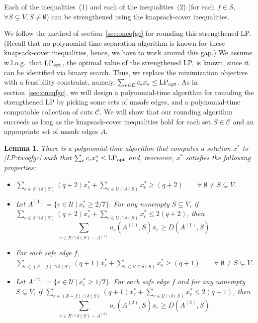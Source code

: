 \documentclass[11pt]{article}
\newtheorem{lemma}[theorem]{Lemma}
\newcommand\lpopt{\hbox{\text{LP}$_{\text{opt}}$}}
\newcommand{\safe}{\mathscr{S}}
\newcommand{\unsafe}{\mathscr{U}}
\newcommand{\C}{\mathscr{C}}
\begin{document}
{{Each of the inequalities~(1) and each of the inequalities~(2) (for
each $f\in\safe$, $\forall S\subsetneq{V},S\not=\emptyset$) can be
strengthened using the knapsack-cover inequalities.  

{
We follow the method of section~\ref{sec:oneqfgc} for rounding this strengthened LP.
(Recall that no polynomial-time separation algorithm is known for
these knapsack-cover inequalities, hence, we have to work around this gap.)
We assume w.l.o.g.\ that $\lpopt$, the optimal value of the
strengthened LP, is known, since it can be identified via binary
search. Thus, we replace the minimization objective with a feasibility
constraint, namely, $\sum_{e\in E}c_e x_e \leq \lpopt$.
As in section~\ref{sec:oneqfgc}, we will design a polynomial-time
algorithm for rounding the strengthened LP by picking some sets of
unsafe edges, and a polynomial-time computable collection of cuts 
$\C$.  We will show that our rounding algorithm succeeds as long 
as the knapsack-cover inequalities hold for each set $S\in\C$ and
an appropriate set of unsafe edges $A$. 
}


{
\begin{lemma}\label{lem:polytimeKC-twoqfgc}
There is a polynomial-time algorithm that computes a solution $x^*$
to \eqref{LP:twoqfgc}
such that $\sum_e c_ex^*_e\leq\lpopt$ and, moreover, $x^*$ satisfies
the following properties:

\begin{itemize}
\item[(P3)]
$\sum_{e\in\safe\cap\delta(S)} (q+2) x^*_e +
\sum_{e\in\unsafe\cap\delta(S)} x^*_e \geq (q+2) \qquad\forall\;
        \emptyset\neq{S}\subsetneq{V}$.

\item[(P4)]
Let $A^{(1)} = \{ e \in  \unsafe~|~x^*_e \ge 2/7 \}.$
For any nonempty ${S}\subsetneq{V}$,
if $\sum_{e\in\safe\cap\delta(S)} (q+2) x^*_e +
\sum_{e\in\unsafe\cap\delta(S)} x^*_e \leq 2(q+2)$, then
$$\sum_{e\in E\cap\delta(S) - A^{(1)}} u_e(A^{(1)},S) x_e \geq D(A^{(1)},S).$$

\item[(P5)]
For each safe edge $f$,
$\sum_{e\in(\safe-f)\cap\delta(S)} (q+1) x^*_e +
\sum_{e\in\unsafe\cap\delta(S)} x^*_e \geq (q+1) \qquad\forall\;
        \emptyset\neq{S}\subsetneq{V}$.

\item[(P6)]
Let $A^{(2)} = \{ e \in  \unsafe~|~x^*_e \ge 1/2 \}.$
For each safe edge $f$ and for any nonempty ${S}\subsetneq{V}$,
if $\sum_{e\in(\safe-f)\cap\delta(S)} (q+1) x^*_e +
\sum_{e\in\unsafe\cap\delta(S)} x^*_e \leq 2(q+1)$, then
$$\sum_{e\in E\cap\delta(S) - A^{(2)}} u_e(A^{(2)},S) x_e \geq D(A^{(2)},S).$$
\end{itemize}
\end{lemma}

}}}
\end{document}
